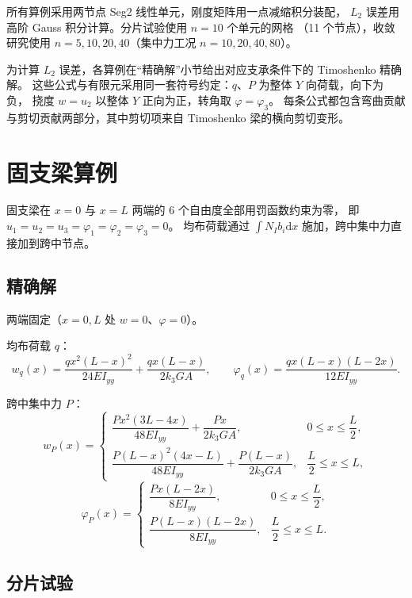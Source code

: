 \documentclass[UTF8,a4paper,11pt]{ctexart}
\newcommand{\ud}{\mathrm{d}}
\begin{document}
所有算例采用两节点 Seg2 线性单元，刚度矩阵用一点减缩积分装配，
$L_2$ 误差用高阶 Gauss 积分计算。分片试验使用 $n=10$ 个单元的网格
（11 个节点），收敛研究使用 $n=5,10,20,40$（集中力工况 $n=10,20,40,80$）。

为计算 $L_2$ 误差，各算例在“精确解”小节给出对应支承条件下的 Timoshenko 精确解。
这些公式与有限元采用同一套符号约定：$q$、$P$ 为整体 $Y$ 向荷载，向下为负，
挠度 $w=u_2$ 以整体 $Y$ 正向为正，转角取 $\varphi=\varphi_3$。
每条公式都包含弯曲贡献与剪切贡献两部分，其中剪切项来自 Timoshenko 梁的横向剪切变形。

\section{固支梁算例}

固支梁在 $x=0$ 与 $x=L$ 两端的 6 个自由度全部用罚函数约束为零，
即 $u_1=u_2=u_3=\varphi_1=\varphi_2=\varphi_3=0$。
均布荷载通过 $\int N_Ib_i\ud x$ 施加，跨中集中力直接加到跨中节点。

\subsection{精确解}

两端固定（$x=0,L$ 处 $w=0$、$\varphi=0$）。

均布荷载 $q$：
\begin{equation}\label{eq:fixed-q}
w_q(x)=\frac{qx^2(L-x)^2}{24EI_{yy}}+\frac{qx(L-x)}{2k_3GA},
\qquad
\varphi_q(x)=\frac{qx(L-x)(L-2x)}{12EI_{yy}}.
\end{equation}

跨中集中力 $P$：
\begin{equation}\label{eq:fixed-P}
w_P(x)=
\begin{cases}
\dfrac{Px^2(3L-4x)}{48EI_{yy}}+\dfrac{Px}{2k_3GA}, & 0\le x\le \dfrac{L}{2},\\[8pt]
\dfrac{P(L-x)^2(4x-L)}{48EI_{yy}}+\dfrac{P(L-x)}{2k_3GA}, & \dfrac{L}{2}\le x\le L,
\end{cases}
\end{equation}
\begin{equation}\label{eq:fixed-P-phi}
\varphi_P(x)=
\begin{cases}
\dfrac{Px(L-2x)}{8EI_{yy}}, & 0\le x\le \dfrac{L}{2},\\[8pt]
\dfrac{P(L-x)(L-2x)}{8EI_{yy}}, & \dfrac{L}{2}\le x\le L.
\end{cases}
\end{equation}

\subsection{分片试验}
\end{document}
